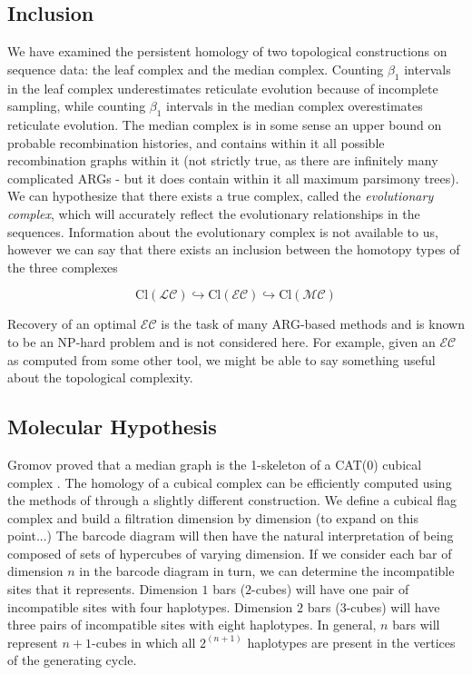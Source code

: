 \subsection{Inclusion}
%
We have examined the persistent homology of two topological constructions on sequence data: the leaf complex and the median complex.
Counting $\beta_1$ intervals in the leaf complex underestimates reticulate evolution because of incomplete sampling, while counting $\beta_1$ intervals in the median complex overestimates reticulate evolution.
The median complex is in some sense an upper bound on probable recombination histories, and contains within it all possible recombination graphs within it (not strictly true, as there are infinitely many complicated ARGs - but it does contain within it all maximum parsimony trees).
We can hypothesize that there exists a true complex, called the \emph{evolutionary complex}, which will accurately reflect the evolutionary relationships in the sequences.
Information about the evolutionary complex is not available to us, however we can say that there exists an inclusion between the homotopy types of the three complexes

\begin{equation}
 \mathrm{Cl}(\mathcal{LC}) \hookrightarrow \mathrm{Cl}(\mathcal{EC}) \hookrightarrow \mathrm{Cl}(\mathcal{MC})
\end{equation}

Recovery of an optimal $\mathcal{EC}$ is the task of many ARG-based methods and is known to be an NP-hard problem and is not considered here.
For example, given an $\mathcal{EC}$ as computed from some other tool, we might be able to say something useful about the topological complexity.

\subsection{Molecular Hypothesis}

Gromov proved that a median graph is the 1-skeleton of a CAT(0) cubical complex \citep{Gromov:1987}.
The homology of a cubical complex can be efficiently computed using the methods of \citet{Kaczynski:2004} through a slightly different construction.
We define a cubical flag complex and build a filtration dimension by dimension (to expand on this point...)
The barcode diagram will then have the natural interpretation of being composed of sets of hypercubes of varying dimension.
If we consider each bar of dimension $n$ in the barcode diagram in turn, we can determine the incompatible sites that it represents.
Dimension $1$ bars ($2$-cubes) will have one pair of incompatible sites with four haplotypes.
Dimension $2$ bars ($3$-cubes) will have three pairs of incompatible sites with eight haplotypes.
In general, $n$ bars will represent $n+1$-cubes in which all $2^{(n+1)}$ haplotypes are present in the vertices of the generating cycle.

